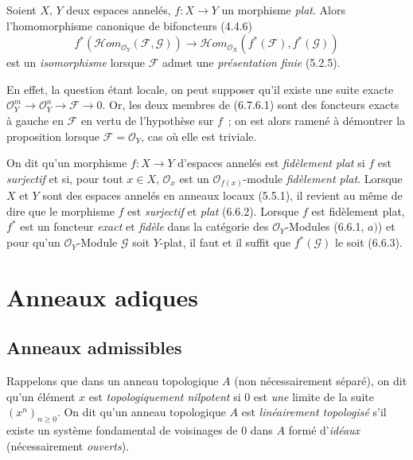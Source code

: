 \begin{env}[6.7.6]
\label{0.6.7.6-fr}
Soient $X$, $Y$ deux espaces annelés, $f:X\to Y$ un morphisme \emph{plat}. Alors
l'homomorphisme canonique de bifoncteurs (4.4.6)
\[
  f^*(\mathcal{H}om_{\mathcal O_Y}(\mathcal F,\mathcal G))
  \longrightarrow
  \mathcal{H}om_{\mathcal O_X}(f^*(\mathcal F),f^*(\mathcal G))
  \tag{6.7.6.1}
  \label{0.6.7.6.1-fr}
\]
est un \emph{isomorphisme} lorsque $\mathcal F$ admet une \emph{présentation finie}
(5.2.5).

En effet, la question étant locale, on peut supposer qu'il existe une suite
exacte $\mathcal O_Y^m\to\mathcal O_Y^n\to\mathcal F\to0$. Or, les deux
membres de (6.7.6.1) sont des foncteurs exacts à gauche en $\mathcal F$ en
vertu de l'hypothèse sur $f$~; on est alors ramené à démontrer la proposition
lorsque $\mathcal F=\mathcal O_Y$, cas où elle est triviale.
\end{env}

\begin{env}[6.7.8]
\label{0.6.7.8-fr}
On dit qu'un morphisme $f:X\to Y$ d'espaces annelés est \emph{fidèlement plat} si
$f$ est \emph{surjectif} et si, pour tout $x\in X$, $\mathcal O_x$ est un
$\mathcal O_{f(x)}$-module \emph{fidèlement plat}. Lorsque $X$ et $Y$ sont des
espaces annelés en anneaux locaux (5.5.1), il revient au même de dire que le
morphisme $f$ est \emph{surjectif} et \emph{plat} (6.6.2). Lorsque $f$ est fidèlement plat,
$f^*$ est un foncteur \emph{exact} et \emph{fidèle} dans la catégorie des
$\mathcal O_Y$-Modules (6.6.1, $a)$) et pour qu'un $\mathcal O_Y$-Module
$\mathcal G$ soit $Y$-plat, il faut et il suffit que $f^*(\mathcal G)$ le
soit (6.6.3).
\end{env}

\section{Anneaux adiques}
\label{section:0.7-fr}

\subsection{Anneaux admissibles}
\label{subsection:0.7.1-fr}

\begin{env}[7.1.1]
\label{0.7.1.1-fr}
Rappelons que dans un anneau topologique $A$ (non nécessairement séparé), on
dit qu'un élément $x$ est \emph{topologiquement nilpotent} si $0$ est \emph{une} limite de
la suite $(x^n)_{n\geq0}$. On dit qu'un anneau topologique $A$ est
\emph{linéairement topologisé} s'il existe un système fondamental de voisinages de
$0$ dans $A$ formé d'\emph{idéaux} (nécessairement \emph{ouverts}).
\end{env}

